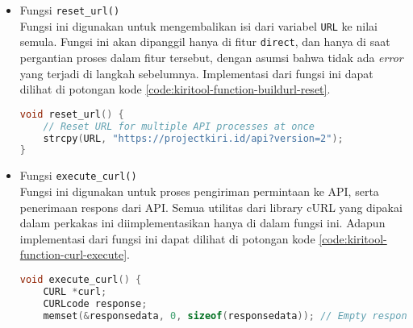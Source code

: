 \begin{itemize}[listparindent=\parindent]
\begin{lstlisting}[language=C, caption=Implementasi fungsi build\textunderscore url\textunderscore findroute(), label=code:kiritool-function-buildurl-findroute]
    // End location check
    if (strcmp(finish, "\0") == 0) {
        error = 1;
        fputs("\nError:\n", stderr);

        if (locale == 1) {
            fputs("You did not input the coordinates of the end location.\n", stderr);
            fputs("Please input the coordinates of the end location through the corresponding option.\n", stderr);
        }
        else {
            fputs("Anda belum memasukkan sebuah koordinat untuk lokasi akhir.\n", stderr);
            fputs("Mohon masukkan koordinat untuk lokasi akhir pencarian rute melalui opsi yang sesuai.\n", stderr);
        }
        exit(0);
    }
    else {
        strcat(URL, "&finish=");
        strcat(URL, finish);
    }

    strcat(URL, "&presentation=desktop");
    strcat(URL, "&apikey=68CD281C8A8EE97C");
}
	\end{lstlisting}
	
	\item Fungsi \verb|reset_url()| \\
	Fungsi ini digunakan untuk mengembalikan isi dari variabel \verb|URL| ke nilai semula. Fungsi ini akan dipanggil hanya di fitur \verb|direct|, dan hanya di saat pergantian proses dalam fitur tersebut, dengan asumsi bahwa tidak ada \textit{error} yang terjadi di langkah sebelumnya. Implementasi dari fungsi ini dapat dilihat di potongan kode \ref{code:kiritool-function-buildurl-reset}.
	
	\begin{lstlisting}[language=C, caption=Implementasi fungsi reset\textunderscore url(), label=code:kiritool-function-buildurl-reset]
void reset_url() {
    // Reset URL for multiple API processes at once
    strcpy(URL, "https://projectkiri.id/api?version=2");
}
	\end{lstlisting}
	
	\item Fungsi \verb|execute_curl()| \\
	Fungsi ini digunakan untuk proses pengiriman permintaan ke API, serta penerimaan respons dari API. Semua utilitas dari library cURL yang dipakai dalam perkakas ini diimplementasikan hanya di dalam fungsi ini. Adapun implementasi dari fungsi ini dapat dilihat di potongan kode \ref{code:kiritool-function-curl-execute}.
	
	\begin{lstlisting}[language=C, caption=Implementasi fungsi execute\textunderscore curl(), label=code:kiritool-function-curl-execute]
void execute_curl() {
    CURL *curl;
    CURLcode response;
    memset(&responsedata, 0, sizeof(responsedata)); // Empty response data chunk for multiprocess modes


\end{lstlisting}
\end{itemize}

